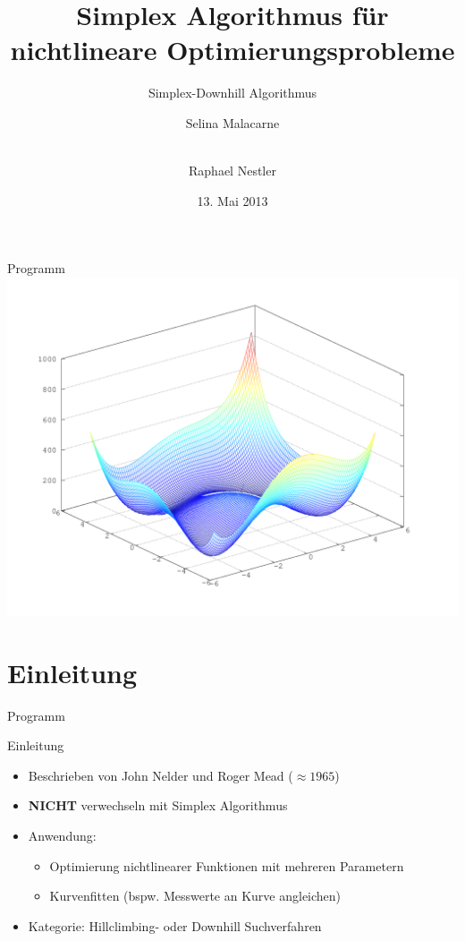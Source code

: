 \documentclass[\outputformat]{beamer}
\author{Selina Malacarne \and\\ Raphael Nestler}
\title{Simplex Algorithmus für nichtlineare Optimierungsprobleme}
\subtitle{Simplex-Downhill Algorithmus}
\date{13. Mai 2013}
\begin{document}
\begin{frame}
\titlepage
\end{frame}

\begin{frame}{Programm}
\tableofcontents
\includegraphics[height=0.5\paperheight]{himmelblau.png}
\end{frame}

\section{Einleitung} 
\begin{frame}{Programm}\tableofcontents[currentsection]\end{frame}

\begin{frame}{Einleitung}
	\begin{itemize}
		\item Beschrieben von John Nelder und Roger Mead ($\approx 1965$)
		\item \textbf{NICHT} verwechseln mit Simplex Algorithmus
		\item Anwendung: 
		\begin{itemize}
			\item Optimierung nichtlinearer Funktionen mit mehreren Parametern 
			\item Kurvenfitten (bspw. Messwerte an Kurve angleichen)
		\end{itemize}	
		\item Kategorie: Hillclimbing- oder Downhill Suchverfahren
	\end{itemize}
\end{frame}
\end{document}
